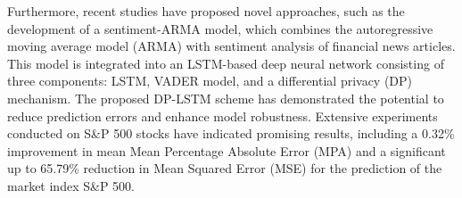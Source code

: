 Furthermore, recent studies have proposed novel approaches, such as the development of a sentiment-ARMA model, which combines the autoregressive moving average model (ARMA) with sentiment analysis of financial news articles. \cite{mehtab2021stock}
This model is integrated into an LSTM-based deep neural network consisting of three components: LSTM, VADER model, and a differential privacy (DP) mechanism. 
The proposed DP-LSTM scheme has demonstrated the potential to reduce prediction errors and enhance model robustness. Extensive experiments conducted on S\&P 500 stocks have indicated promising results, 
including a 0.32\% improvement in mean Mean Percentage Absolute Error (MPA) 
and a significant up to 65.79\% reduction in Mean Squared Error (MSE) for the prediction of the market index S\&P 500.
